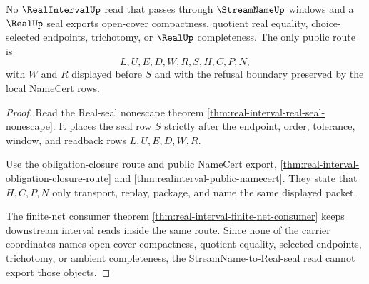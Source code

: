 \begin{theorem}
\label{thm:realinterval-stream-real-seal-nonescape}
No $\RealIntervalUp$ read that passes through $\StreamNameUp$ windows and a $\RealUp$ seal exports open-cover compactness, quotient real equality, choice-selected endpoints, trichotomy, or $\RealUp$ completeness. The only public route is
$$
L,U,E,D,W,R,S,H,C,P,N,
$$
with $W$ and $R$ displayed before $S$ and with the refusal boundary preserved by the local NameCert rows.
\end{theorem}
\begin{proof}
Read the Real-seal nonescape theorem \autoref{thm:real-interval-real-seal-nonescape}. It places the seal row $S$ strictly after the endpoint, order, tolerance, window, and readback rows $L,U,E,D,W,R$.

Use the obligation-closure route and public NameCert export, \autoref{thm:real-interval-obligation-closure-route} and \autoref{thm:realinterval-public-namecert}. They state that $H,C,P,N$ only transport, replay, package, and name the same displayed packet.

The finite-net consumer theorem \autoref{thm:real-interval-finite-net-consumer} keeps downstream interval reads inside the same route. Since none of the carrier coordinates names open-cover compactness, quotient equality, selected endpoints, trichotomy, or ambient completeness, the StreamName-to-Real-seal read cannot export those objects.
\end{proof}

